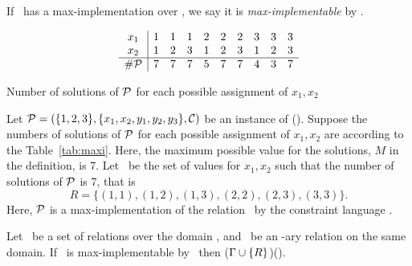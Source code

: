 If \mR\ has a max-implementation over \mrelset, we say it is \emph{max-implementable} by \mrelset\@.

\begin{example}
\begin{table}[b]
\begin{eqnarray*}
\begin{array}{c|ccccccccc}
x_1 & 1 & 1 & 1 & 2 & 2 & 2 & 3 & 3 & 3\\
x_2 & 1 & 2 & 3 & 1 & 2 & 3 & 1 & 2 & 3\\
\hline
\#\mathcal{P} & 7 & 7 & 7 & 5 & 7 & 7 & 4 & 3 & 7\\ 
\end{array}
\end{eqnarray*}
\caption{Number of solutions of \ensuremath{\probi} for each possible assignment of \ensuremath{x_1,x_2}}\label{tab:maxi}
\end{table}
Let \(\mathcal{P} = (\{1,2,3\}, \{x_1,x_2,y_1,y_2,y_3\}, \mathcal{C})\) be an instance
of \ccsp(\mrelset)\@. Suppose the numbers of solutions of \(\mathcal{P}\) for each possible
assignment of \(x_1, x_2\) are according to the Table~\ref{tab:maxi}\@.
Here, the maximum possible value for the solutions, \(M\) in the definition, is 7.
Let \mR\ be the set of values for \(x_1,x_2\) such that
the number of solutions of \(\mathcal{P}\) is 7, that is 
\[R = \{(1,1), (1,2), (1,3), (2,2), (2,3), (3,3)\}.\]
Here, \(\mathcal{P}\) is a max-implementation of the relation \mR\ by the constraint language 
\mrelset\@.
\end{example}


\begin{theorem}[Maximization]\label{theo:max}
Let \mrelset\ be a set of relations over the domain \mD,
and \mR\ be an \mn-ary relation on the same domain. 
If \mR\ is max-implementable by \mrelset\ then \ccsp(\(\Gamma \cup \{{R}\}\))\maple\ccsp(\mrelset)\@.
\end{theorem}

